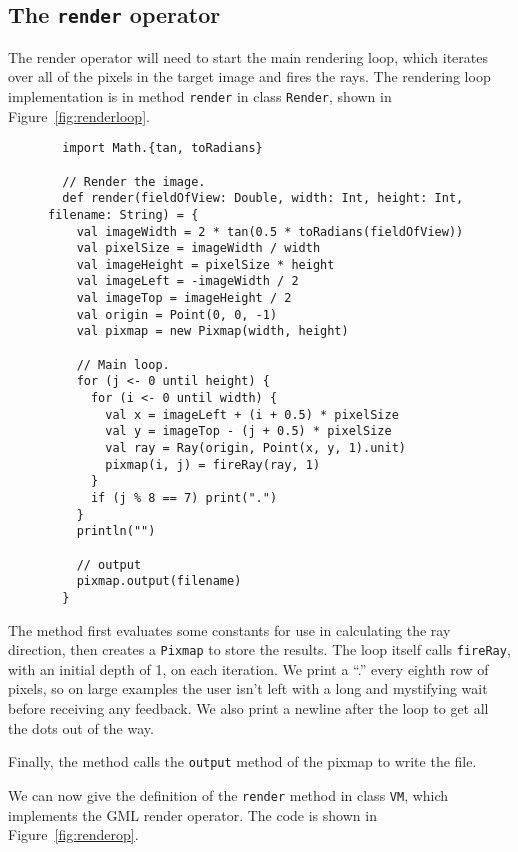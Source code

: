 \subsection{The \texttt{render} operator\label{sec:render}}

The render operator will need to start the main rendering loop,
which iterates over all of the pixels in the target image and fires the rays.
The rendering loop implementation is
in method \verb!render! in class \verb!Render!,
shown in Figure~\ref{fig:renderloop}.

\begin{figure}
\begin{verbatim}
  import Math.{tan, toRadians}

  // Render the image.
  def render(fieldOfView: Double, width: Int, height: Int, filename: String) = {
    val imageWidth = 2 * tan(0.5 * toRadians(fieldOfView))
    val pixelSize = imageWidth / width
    val imageHeight = pixelSize * height
    val imageLeft = -imageWidth / 2
    val imageTop = imageHeight / 2
    val origin = Point(0, 0, -1)
    val pixmap = new Pixmap(width, height)

    // Main loop.
    for (j <- 0 until height) {
      for (i <- 0 until width) {
        val x = imageLeft + (i + 0.5) * pixelSize
        val y = imageTop - (j + 0.5) * pixelSize
        val ray = Ray(origin, Point(x, y, 1).unit)
        pixmap(i, j) = fireRay(ray, 1)
      }
      if (j % 8 == 7) print(".")
    }
    println("")

    // output
    pixmap.output(filename)
  }
\end{verbatim}
\getcaption
\end{figure}

The method first evaluates some constants
for use in calculating the ray direction,
then creates a \verb!Pixmap! to store the results.
The loop itself calls \verb!fireRay!,
with an initial depth of 1,
on each iteration.
We print a ``.'' every eighth row of pixels,
so on large examples the user isn't left with
a long and mystifying wait before receiving any feedback.
We also print a newline after the loop to get all the dots out of the way.

Finally, the method calls the \verb!output! method of the pixmap
to write the file.

We can now give the definition of the \verb!render! method
in class \verb!VM!,
which implements the GML render operator.
The code is shown in Figure~\ref{fig:renderop}.

